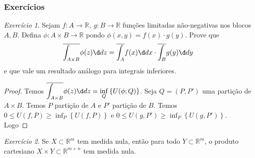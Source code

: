 \documentclass{article}
\theoremstyle{plain}
\theoremstyle{definition}
\theoremstyle{remark}
\newtheorem{exercicio}{Exercício}[subsection]
\begin{document}
\subsubsection{Exercícios}
\begin{exercicio}
	Sejam $f:A \to \mathbb{R}, \: g:B \to \mathbb{R}$ funções limitadas não-negativas nos blocos $A,B$. Defina $\phi: A\times B \to \mathbb{R}$ pondo $\phi(x,y) = f(x)\cdot g(y)$. Prove que $$ \overline{\int_{A\times B}} \phi(z) \d dz = \overline{\int_{A}} f(x) \d dx \cdot \overline{\int_{ B}} g(y) \d dy$$
	e que vale um resultado análogo para integrais inferiores.
\end{exercicio}
\begin{proof}
	Temos $ \displaystyle\overline{\int_{A\times B}} \phi(z) \d dz = \inf_{Q}\left\{ U(\phi; Q)\right\}$. Seja $Q = (P,P')$ uma partição de $A\times B$. Temos $P$ partição de $A$ e $P'$ partição de  $B$. Temos $0 \leq U(f,P) \geq \inf_{P} \left\{ U(f,P)\right\}$ e  $ 0\leq U(g,P') \geq \inf_{P} \left\{ U(g,P')\right\}$. Logo 
\end{proof}
\begin{exercicio}
	Se $X\subset \mathbb{R}^m$ tem medida nula, então  para todo $Y \subset \mathbb{R}^m$, o produto cartesiano $X\times Y \subset \mathbb{R}^{m+n}$ tem medida nula.
\end{exercicio}
\end{document}
